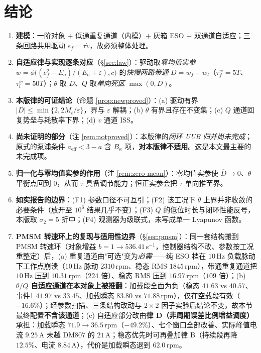 \documentclass[11pt]{article}
\theoremstyle{remark}\newtheorem{remark}{注}
\newcommand{\ef}{e_f}
\newcommand{\aeff}{a_{\mathrm{eff}}}
\begin{document}
\section{结论}\label{sec:concl}
\begin{enumerate}
  \item \textbf{建模}：一阶对象 $+$ 低通重复通道（内模）$+$ 灰箱 ESO $+$ 双通道自适应；三条回路共用驱动 $\ef=\tau\dot v$，故必须整体处理。
  \item \textbf{自适应律与实现逐条对应}（\S\ref{sec:law}）：驱动取\emph{零均值实参} $w=\phi\big((\ef^{2}-E_o)/(E_o+\varepsilon),c\big)$ 的\emph{快慢两路带通} $D=w_f-w_l$（$\tau_f^w=5T$、$\tau_l^w=50T$）；$\theta$ 取 $D$、$Q$ 取\emph{单向死区} $\max(0,D)$。
  \item \textbf{本版律的可证结论}（命题 \ref{prop:newproved}）：(a) 驱动有界 $|D|\le\min\{2,2M_t/\varepsilon\}$，界与 $\varepsilon$ 解耦；(b) $\theta$ 有界且存在不变集；(c) $Q$ 通道回复势垒与耗散率下界；(d) $v$ 通道 ISS。
  \item \textbf{尚未证明的部分}（注 \ref{rem:notproved}）：本版律的\emph{闭环 UUB 归并尚未完成}；原式的泵浦条件 $\aeff<3-a$ 含 $B_\kappa$ 项，\textbf{对本版律不适用}。这是本文最主要的未完成项。
  \item \textbf{归一化与零均值实参的作用}（注 \ref{rem:zero-mean}）：零均值实参使 $\overline{D}\to0$、$\theta$ 平衡点回到 $0$，从而 $\tau$ 具备调节能力；恒正实参会把 $\tau$ 单向推至界。
  \item \textbf{如实报告的边界}：(F1) 参数口径不可互引；(F2) 该工况下 $\theta$ 上界并非收敛的必要条件（放开至 $10^{6}$ 结果几乎不变）；(F3) $Q$ 的低位时长与闭环性能反号，本版取 $\sigma_2=5$ 折中；(F4) 观测器为级联式，未写成单一 Lyapunov 函数。
  \item \textbf{PMSM 转速环上的复现与适用性边界}（\S\ref{sec:pmsm}）：同一套结构搬到 PMSM 转速环（对象增益 $b=1\to536.41$\,s$^{-1}$，控制器结构不改、参数按工况重整定）后，(a) 重复通道由"可选"变为\emph{必需}——纯 ESO 档在 $10$\,Hz 负载脉动下工作点崩溃（$10$\,Hz 脉动 $2310$\,rpm、稳态 RMS $1845$\,rpm），带通重复通道把 $10$\,Hz 压到 $10.31$\,rpm（$224$ 倍）、稳态 RMS 压到 $16.97$\,rpm（$109$ 倍）；(b) \textbf{$\theta/Q$ 自适应通道在本对象上被推翻}：加载段全面为负（稳态 $41.63$ vs $40.57$、事件1 $41.97$ vs $33.45$、加载瞬态 $83.80$ vs $71.88$\,rpm），仅在空载段有效（$-16.6\%$）；经参数扫描、三条结构改动与 $2\times2$ 因子实验后结论不变，故本节最终配置\textbf{不含该通道}；(c) 自适应部分改由\textbf{律 D（非周期误差比例增益调度）}承担：加载瞬态 $71.9\to36.5$\,rpm（$-49.2\%$）、七个窗口全部改善、实际峰值电流 $9.25$\,A 未越 DM807 的 $21$\,A；稳态优先时可再叠加律 B（持续段再降 $12.5\%$、电流 $8.84$\,A），代价是加载瞬态退到 $62.0$\,rpm。

\end{enumerate}
\end{document}

